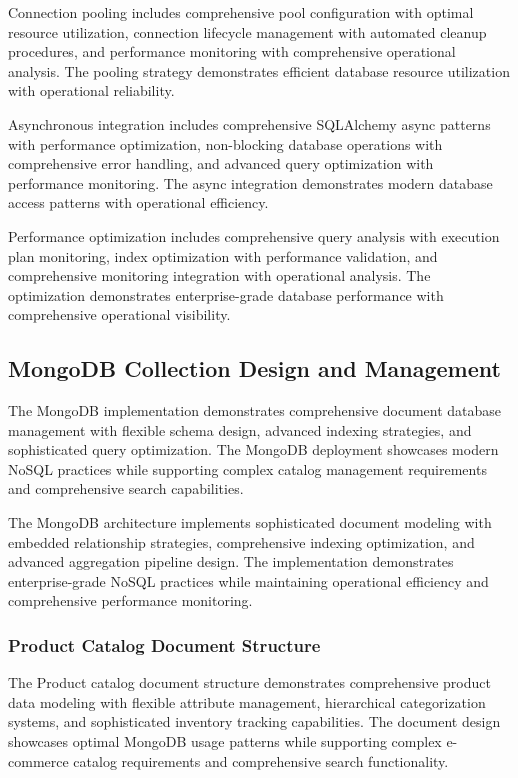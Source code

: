 Connection pooling includes comprehensive pool configuration with optimal resource utilization, connection lifecycle management with automated cleanup procedures, and performance monitoring with comprehensive operational analysis. The pooling strategy demonstrates efficient database resource utilization with operational reliability.

Asynchronous integration includes comprehensive SQLAlchemy async patterns with performance optimization, non-blocking database operations with comprehensive error handling, and advanced query optimization with performance monitoring. The async integration demonstrates modern database access patterns with operational efficiency.

Performance optimization includes comprehensive query analysis with execution plan monitoring, index optimization with performance validation, and comprehensive monitoring integration with operational analysis. The optimization demonstrates enterprise-grade database performance with comprehensive operational visibility.

\subsection{MongoDB Collection Design and Management}

The MongoDB implementation demonstrates comprehensive document database management with flexible schema design, advanced indexing strategies, and sophisticated query optimization. The MongoDB deployment showcases modern NoSQL practices while supporting complex catalog management requirements and comprehensive search capabilities.

The MongoDB architecture implements sophisticated document modeling with embedded relationship strategies, comprehensive indexing optimization, and advanced aggregation pipeline design. The implementation demonstrates enterprise-grade NoSQL practices while maintaining operational efficiency and comprehensive performance monitoring.

\subsubsection{Product Catalog Document Structure}

The Product catalog document structure demonstrates comprehensive product data modeling with flexible attribute management, hierarchical categorization systems, and sophisticated inventory tracking capabilities. The document design showcases optimal MongoDB usage patterns while supporting complex e-commerce catalog requirements and comprehensive search functionality.

